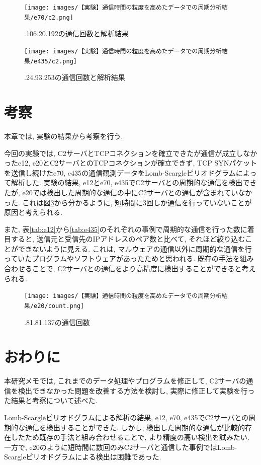 \documentclass[twocolumn,10pt]{ltjsarticle}
\begin{document}
\begin{figure}[htbp]
    \centering

    \texttt{[image: images/【実験】通信時間の粒度を高めたデータでの周期分析結果/e70/c2.png]}

    \caption{\ast\ast\ast.106.20.192の通信回数と解析結果}
    \label{fig:e70_result}
\end{figure}

\begin{figure}[htbp]
    \centering

    \texttt{[image: images/【実験】通信時間の粒度を高めたデータでの周期分析結果/e435/c2.png]}

    \caption{\ast\ast\ast.24.93.253の通信回数と解析結果}
    \label{fig:e435_result}
\end{figure}

\section{考察}
本章では, 実験の結果から考察を行う. 

今回の実験では, C2サーバとTCPコネクションを確立できたが通信が成立しなかったe12, e20とC2サーバとのTCPコネクションが確立できず, TCP SYNパケットを送信し続けたe70, e435の通信観測データをLomb-Scargleピリオドグラムによって解析した. 実験の結果, e12とe70, e435でC2サーバとの周期的な通信を検出できたが, e20では検出した周期的な通信の中にC2サーバとの通信が含まれていなかった. これは図\ref{fig:e20_count}から分かるように, 短時間に3回しか通信を行っていないことが原因と考えられる. 

また, 表\ref{tab:e12}から\ref{tab:e435}のそれぞれの事例で周期的な通信を行った数に着目すると, 送信元と受信先のIPアドレスのペア数と比べて, それほど絞り込むことができないように見える. これは, マルウェアの通信以外に周期的な通信を行っていたプログラムやソフトウェアがあったためと思われる. 既存の手法を組み合わせることで, C2サーバとの通信をより高精度に検出することができると考えられる. 

\begin{figure}[htbp]
    \centering

    \texttt{[image: images/【実験】通信時間の粒度を高めたデータでの周期分析結果/e20/count.png]}

    \caption{\ast\ast\ast.81.81.137の通信回数}
    \label{fig:e20_count}
\end{figure}

\section{おわりに}
本研究メモでは, これまでのデータ処理やプログラムを修正して, C2サーバの通信を検出できなかった問題を改善する方法を検討し, 実際に修正して実験を行った結果と考察について述べた. 

Lomb-Scargleピリオドグラムによる解析の結果, e12, e70, e435でC2サーバとの周期的な通信を検出することができた. しかし, 検出した周期的な通信が比較的存在したため既存の手法と組み合わせることで, より精度の高い検出を試みたい. 一方で, e20のように短時間に数回のみC2サーバと通信した事例ではLomb-Scargleピリオドグラムによる検出は困難であった. 



\end{document}
